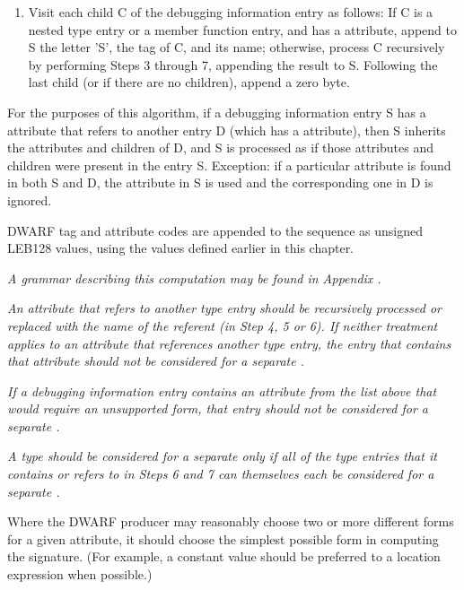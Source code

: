 \begin{enumerate}[1.]
\item Visit each child C of the debugging information
entry as follows: If C is a nested type entry or a member
function entry, and has 
a  attribute, append to
S the letter 'S', the tag of C, and its name; otherwise,
process C recursively by performing Steps 3 through 7,
appending the result to S. Following the last child (or if
there are no children), append a zero byte.
\end{enumerate}



For the purposes of this algorithm, if a debugging information
entry S has a 
attribute that refers to
another entry D (which has a 
attribute),
then S inherits the attributes and children of D, and S is
processed as if those attributes and children were present in
the entry S. Exception: if a particular attribute is found in
both S and D, the attribute in S is used and the corresponding
one in D is ignored.

DWARF tag and attribute codes are appended to the sequence
as unsigned LEB128 values, using the values defined earlier
in this chapter.

\textit{A grammar describing this computation may be found in
Appendix .
}

\textit{An attribute that refers to another type entry should
be recursively processed or replaced with the name of the
referent (in Step 4, 5 or 6). If neither treatment applies to
an attribute that references another type entry, the entry
that contains that attribute should not be considered for a
separate .}

\textit{If a debugging information entry contains an attribute from
the list above that would require an unsupported form, that
entry should not be considered for a separate 
.}

\textit{A type should be considered for a separate 
 only
if all of the type entries that it contains or refers to in
Steps 6 and 7 can themselves each be considered for a separate
.}

Where the DWARF producer may reasonably choose two or more
different forms for a given attribute, it should choose
the simplest possible form in computing the signature. (For
example, a constant value should be preferred to a location
expression when possible.)

